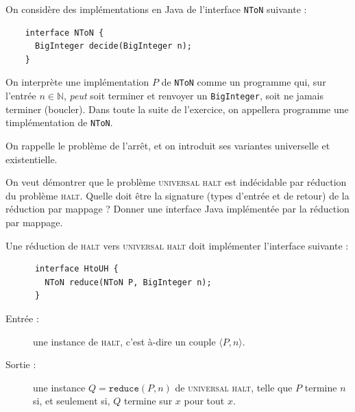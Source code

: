 
\begingroup

\begin{exercice}

  On considère des implémentations en Java de l'interface \texttt{NToN} suivante :
  \begin{lstlisting}
    interface NToN {
      BigInteger decide(BigInteger n);
    }
  \end{lstlisting}
  On interprète une implémentation $P$ de \texttt{NToN} comme un programme qui, sur l'entrée $n\in\mathbb{N}$,
  \emph{peut} soit terminer et renvoyer un \texttt{BigInteger}, soit ne jamais terminer (boucler).
  Dans toute la suite de l'exercice, on appellera \og{} programme \fg{} une timplémentation de \texttt{NToN}.

  On rappelle le problème de l'arrêt, et on introduit ses variantes universelle et existentielle.




  \begin{questions}
  \item On veut démontrer que le problème \textsc{universal halt} est indécidable par réduction du problème \textsc{halt}.
    Quelle doit être la signature (types d'entrée et de retour) de la réduction par mappage ? Donner une interface Java
    implémentée par la réduction par mappage. 
  \end{questions}
  \begin{corrections}
    Une réduction de \textsc{halt} vers \textsc{universal halt} doit implémenter l'interface suivante :
    \begin{lstlisting}
      interface HtoUH {
        NToN reduce(NToN P, BigInteger n);
      }
    \end{lstlisting}

    \begin{description}
    \item[Entrée :] une instance de \textsc{halt}, c'est à-dire un couple $\langle P, n \rangle$.
    \item[Sortie :] une instance $Q = \texttt{reduce}(P, n)$ de \textsc{universal halt}, telle que $P$ termine $n$ si,
      et seulement si, $Q$ termine sur $x$ pour tout $x$. 
    \end{description}
  \end{corrections}


\end{exercice}
